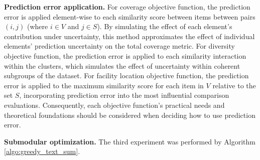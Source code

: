 \textbf{Prediction error application.}
For coverage objective function, the prediction error is applied element-wise to each similarity score between items between pairs $(i, j)$ (where $i \in V$ and $j \in S$). By simulating the effect of each element's contribution under uncertainty, this method approximates the effect of individual elements' prediction uncertainty on the total coverage metric. For diversity objective function, the prediction error is applied to each similarity interaction within the clusters, which simulates the effect of uncertainty within coherent subgroups of the dataset. For facility location objective function, the prediction error is applied to the maximum similarity score for each item in $V$ relative to the set $S$, incorporating prediction error into the most influential comparison evaluations. 
Consequently, each objective function's practical needs and theoretical foundations should be considered when deciding how to use prediction error.






\textbf{Submodular optimization.}
The third experiment was performed by Algorithm \ref{algo:greedy_text_sum}.


